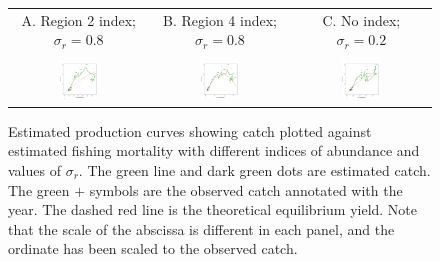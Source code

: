 \documentclass[12pt,letterpaper]{article}
\begin{document}
\begin{figure}
\begin{center}
{\scriptsize \sffamily
\begin{tabular}{ccc}
A. Region 2 index; $\sigma_r=0.8$ &
B. Region 4 index; $\sigma_r=0.8$ &
C. No index; $\sigma_r=0.2$ \\
\\
\includegraphics[width=0.30\textwidth]{./4-gear-runs_r2_prodB1.pdf} &
\includegraphics[width=0.30\textwidth]{./4-gear-runs_r4_prodB1.pdf} &
\includegraphics[width=0.30\textwidth]{./4-gear-runs_r0-sdrprior_prodB1.pdf}\\
\end{tabular}
}
\caption{Estimated production curves showing catch plotted against
estimated fishing mortality with different indices of abundance
and values of $\sigma_r$.
The green line and dark green dots are estimated catch.
The green $+$ symbols are the observed catch annotated with the year.
The dashed red line is the theoretical equilibrium yield.
Note that the scale of the abscissa is different in each panel, and
the ordinate has been scaled to the observed catch.
\label{fig:estprod}}
\end{center}
\end{figure}
\end{document}
